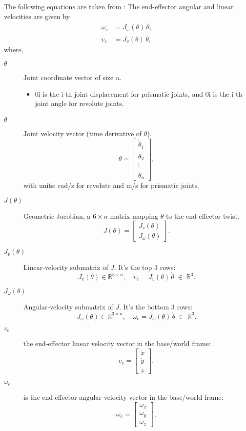 \documentclass[12pt]{article}
\begin{document}
The following equations are taken from \cite{ref19}:
The end-effector angular and linear velocities are given by
\begin{align}
  \omega_e &= J_{\omega}(\theta)\,\dot{\theta}, \\
  v_e      &= J_{v}(\theta)\,\dot{\theta},
\end{align}
where,

\begin{description}
  \item[$\theta$]%
    Joint coordinate vector of size $n$.
    \begin{itemize}
      \item 0i is the i-th joint displacement for prismatic joints, and 0i is the i-th joint angle for revolute joints.
    \end{itemize}

  \item[$\dot{\theta}$]%
    Joint velocity vector (time derivative of $\theta$).
    \[
      \dot{\theta} = \begin{bmatrix}
        \dot{\theta}_1 \\ \dot{\theta}_2 \\ \vdots \\ \dot{\theta}_n
      \end{bmatrix},
    \] 
    with units: rad/s for revolute and m/s for prismatic joints.

  \item[$J(\theta)$]%
    Geometric Jacobian, a $6\times n$ matrix mapping $\dot\theta$ to the end-effector twist.
    \[
      J(\theta) = 
      \begin{bmatrix}
        J_v(\theta) \\[6pt]
        J_\omega(\theta)
      \end{bmatrix}.
    \]

  \item[$J_v(\theta)$]%
    Linear‐velocity submatrix of $J$. It’s the top 3 rows:
    \[
      J_v(\theta) \in \mathbb{R}^{3\times n},
      \quad
      v_e = J_v(\theta)\,\dot\theta
      \;\in\; \mathbb{R}^3.
    \]

  \item[$J_\omega(\theta)$]%
    Angular‐velocity submatrix of $J$. It’s the bottom 3 rows:
    \[
      J_\omega(\theta) \in \mathbb{R}^{3\times n},
      \quad
      \omega_e = J_\omega(\theta)\,\dot\theta
      \;\in\; \mathbb{R}^3.
    \]

  \item[$v_e$] the end‐effector linear velocity vector in the base/world frame:
    \[
      v_e = \begin{bmatrix} \dot{x} \\ \dot{y} \\ \dot{z} \end{bmatrix},
    \]

  \item[$\omega_e$]is the end‐effector angular velocity vector in the base/world frame:
    \[
      \omega_e = \begin{bmatrix} \omega_x \\ \omega_y \\ \omega_z \end{bmatrix},
    \]
\end{description}
\end{document}
